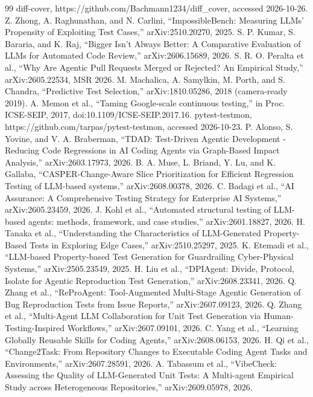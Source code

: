 \documentclass[conference]{IEEEtran}
\begin{document}
\begin{thebibliography}{99}
 diff-cover, https://github.com/Bachmann1234/diff\_cover, accessed 2026-10-26.
 Z. Zhong, A. Raghunathan, and N. Carlini, ``ImpossibleBench: Measuring LLMs' Propensity of Exploiting Test Cases,'' arXiv:2510.20270, 2025.
 S. P. Kumar, S. Bararia, and K. Raj, ``Bigger Isn't Always Better: A Comparative Evaluation of LLMs for Automated Code Review,'' arXiv:2606.15689, 2026.
 S. R. O. Peralta et al., ``Why Are Agentic Pull Requests Merged or Rejected? An Empirical Study,'' arXiv:2605.22534, MSR 2026.
 M. Machalica, A. Samylkin, M. Porth, and S. Chandra, ``Predictive Test Selection,'' arXiv:1810.05286, 2018 (camera-ready 2019).
 A. Memon et al., ``Taming Google-scale continuous testing,'' in Proc. ICSE-SEIP, 2017, doi:10.1109/ICSE-SEIP.2017.16.
 pytest-testmon, https://github.com/tarpas/pytest-testmon, accessed 2026-10-23.
 P. Alonso, S. Yovine, and V. A. Braberman, ``TDAD: Test-Driven Agentic Development - Reducing Code Regressions in AI Coding Agents via Graph-Based Impact Analysis,'' arXiv:2603.17973, 2026.
 B. A. Muse, L. Briand, Y. Lu, and K. Gallaba, ``CASPER-Change-Aware Slice Prioritization for Efficient Regression Testing of LLM-based systems,'' arXiv:2608.00378, 2026.
 C. Badagi et al., ``AI Assurance: A Comprehensive Testing Strategy for Enterprise AI Systems,'' arXiv:2605.23459, 2026.
 J. Kohl et al., ``Automated structural testing of LLM-based agents: methods, framework, and case studies,'' arXiv:2601.18827, 2026.
 H. Tanaka et al., ``Understanding the Characteristics of LLM-Generated Property-Based Tests in Exploring Edge Cases,'' arXiv:2510.25297, 2025.
 K. Etemadi et al., ``LLM-based Property-based Test Generation for Guardrailing Cyber-Physical Systems,'' arXiv:2505.23549, 2025.
 H. Liu et al., ``DPIAgent: Divide, Protocol, Isolate for Agentic Reproduction Test Generation,'' arXiv:2608.23341, 2026.
 Q. Zhang et al., ``ReProAgent: Tool-Augmented Multi-Stage Agentic Generation of Bug Reproduction Tests from Issue Reports,'' arXiv:2607.09123, 2026.
 Q. Zhang et al., ``Multi-Agent LLM Collaboration for Unit Test Generation via Human-Testing-Inspired Workflows,'' arXiv:2607.09101, 2026.
 C. Yang et al., ``Learning Globally Reusable Skills for Coding Agents,'' arXiv:2608.06153, 2026.
 H. Qi et al., ``Change2Task: From Repository Changes to Executable Coding Agent Tasks and Environments,'' arXiv:2607.28591, 2026.
 A. Tabassum et al., ``VibeCheck: Assessing the Quality of LLM-Generated Unit Tests: A Multi-agent Empirical Study across Heterogeneous Repositories,'' arXiv:2609.05978, 2026.

\end{thebibliography}
\end{document}
